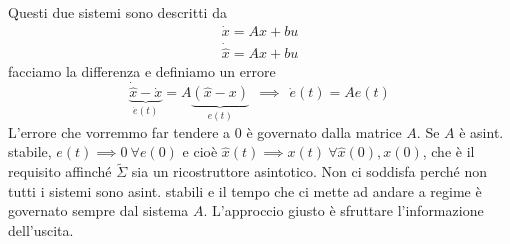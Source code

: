 Questi due sistemi sono descritti da
\begin{gather*}
	\dot{x} =Ax+bu\\
	\dot{\hat{x}} =A\hat{x} +bu
\end{gather*}
facciamo la differenza e definiamo un errore
\begin{equation*}
	\underbrace{\dot{\hat{x}} -\dot{x}}_{\dot{e}(t)} =A\underbrace{(\hat{x} -x)}_{e(t)} \ \ \implies \ \ \dot{e}(t) =Ae(t)
\end{equation*}
L'errore che vorremmo far tendere a $0$ è governato dalla matrice $A$. Se $A$ è asint. stabile, $e(t)\implies 0\ \forall e(0)$ e cioè $\hat{x}(t)\implies x(t) \ \forall \hat{x}(0) ,x(0)$, che è il requisito affinché $\tilde{\Sigma }$ sia un ricostruttore asintotico. Non ci soddisfa perché non tutti i sistemi sono asint. stabili e il tempo che ci mette ad andare a regime è governato sempre dal sistema $A$. L'approccio giusto è sfruttare l'informazione dell'uscita.

